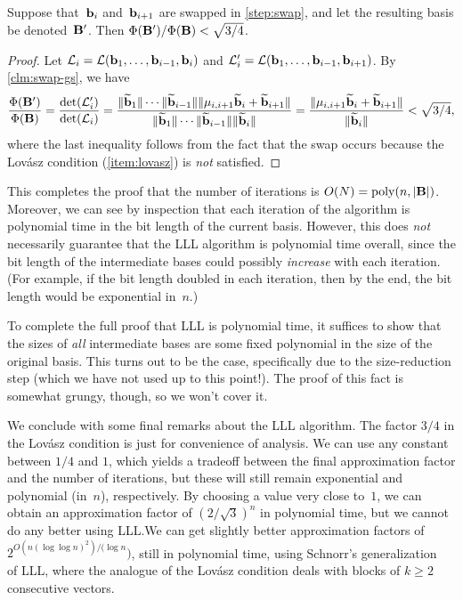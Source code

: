 \documentclass[11pt]{article}
\begin{document}
\begin{lemma}
  \label{lem:lll-potential}
  Suppose that~$\mathbf{b}_{i}$ and~$\mathbf{b}_{i+1}$ are swapped in
  \cref{step:swap}, and let the resulting basis be denoted~$\mathbf{B}'$.
  Then $\Phi(\mathbf{B}')/\Phi(\mathbf{B}) < \sqrt{3/4}$.
\end{lemma}

\begin{proof}
  Let $\mathcal{L}_i = \mathcal{L}( \mathbf{b}_1, \ldots , \mathbf{b}_{i-1}, \mathbf{b}_i ) $ and
  $\mathcal{L}_i' = \mathcal{L}( \mathbf{b}_1, \ldots , \mathbf{b}_{i-1}, \mathbf{b}_{i+1} ) $. By
  \cref{clm:swap-gs}, we have
  \begin{equation}
    \begin{split}
      \frac{\Phi(\mathbf{B}')}{\Phi(\mathbf{B})} =
      \frac{\det(\mathcal{L}_i')}{\det(\mathcal{L}_i)} =
      \frac{\lVert\widetilde{\mathbf{b}}_{1}\rVert \cdots \lVert\widetilde{\mathbf{b}}_{i-1}\rVert
      \lVert\mu_{i,i+1} \widetilde{\mathbf{b}}_{i} + \widetilde{\mathbf{b}}_{i+1}\rVert
      }{\lVert\widetilde{\mathbf{b}}_{1}\rVert \cdots \lVert\widetilde{\mathbf{b}}_{i-1}\rVert
      \lVert\widetilde{\mathbf{b}}_{i}\rVert} = \frac{\lVert\mu_{i,i+1}
      \widetilde{\mathbf{b}}_{i} + \widetilde{\mathbf{b}}_{i+1}\rVert}{\lVert\widetilde{\mathbf{b}}_{i}\rVert}
      < \sqrt{3/4},
    \end{split}
  \end{equation}
  where the last inequality follows from the fact that the swap occurs
  because the Lov{\'a}sz condition (\cref{item:lovasz}) is \emph{not}
  satisfied.
\end{proof}

This completes the proof that the number of iterations is
$O(N) = \operatorname{poly}(n, \lvert\mathbf{B}\rvert)$. Moreover, we can see by inspection
that each iteration of the algorithm is polynomial time in the bit
length of the current basis. However, this does \emph{not} necessarily
guarantee that the LLL algorithm is polynomial time overall, since the
bit length of the intermediate bases could possibly \emph{increase}
with each iteration. (For example, if the bit length doubled in each
iteration, then by the end, the bit length would be exponential
in~$n$.)

To complete the full proof that LLL is polynomial time, it suffices to
show that the sizes of \emph{all} intermediate bases are some fixed
polynomial in the size of the original basis. This turns out to be the
case, specifically due to the size-reduction step (which we have not
used up to this point!). The proof of this fact is somewhat grungy,
though, so we won't cover it.

We conclude with some final remarks about the LLL algorithm. The
factor $3/4$ in the Lov{\'a}sz condition is just for convenience of
analysis. We can use any constant between $1/4$ and $1$, which yields
a tradeoff between the final approximation factor and the number of
iterations, but these will still remain exponential and polynomial
(in~$n$), respectively. By choosing a value very close to~$1$, we can
obtain an approximation factor of $(2/\sqrt{3})^{n}$ in polynomial
time, but we cannot do any better using LLL.\@ We can get slightly
better approximation factors of $2^{O(n(\log\log n)^2)/(\log n})$,
still in polynomial time, using Schnorr's
generalization~\cite{DBLP:journals/tcs/Schnorr87} of LLL, where the
analogue of the Lov{\'a}sz condition deals with blocks of $k \geq 2$
consecutive vectors.
\end{document}
